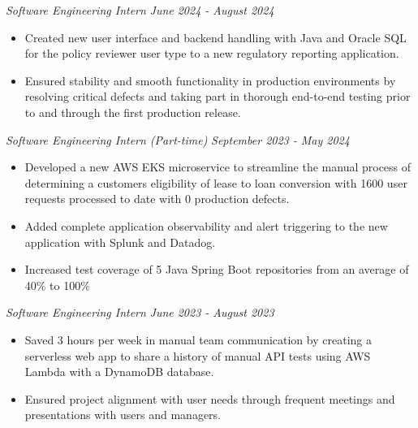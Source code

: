 \documentclass[letterpaper]{article}
\begin{document}
    \textit{Software Engineering Intern} \hfill \textsl{June 2024 - August 2024}\\
    \vspace{-7pt}
    \begin{itemize} \itemsep -1mm

            \item Created new user interface and backend handling with Java and Oracle SQL for the policy reviewer user type to a new regulatory reporting application.

            \item Ensured stability and smooth functionality in production environments by resolving critical defects and taking part in thorough end-to-end testing prior to and through the first production release.
        
    \end{itemize}
    \vspace{-2mm}

    \textit{Software Engineering Intern (Part-time)} \hfill \textsl{September 2023 - May 2024}\\
    \vspace{-7pt}
    \begin{itemize} \itemsep -1mm
    
            \item Developed a new AWS EKS microservice to streamline the manual process of determining a customers eligibility of lease to loan conversion with 1600 user requests processed to date with 0 production defects.

            \item Added complete application observability and alert triggering to the new application with Splunk and Datadog.

            \item Increased test coverage of 5 Java Spring Boot repositories from an average of 40\% to 100\%
        
    \end{itemize}
    \vspace{-2mm}

    \textit{Software Engineering Intern} \hfill \textsl{June 2023 - August 2023}\\
    \vspace{-7pt}
    \begin{itemize} \itemsep -1mm
        
            \item Saved 3 hours per week in manual team communication by creating a serverless web app to share a history of manual API tests using AWS Lambda with a DynamoDB database.
        
            \item Ensured project alignment with user needs through frequent meetings and presentations with users and managers.
        
    \end{itemize}
    \vspace{-2mm}
\end{document}

